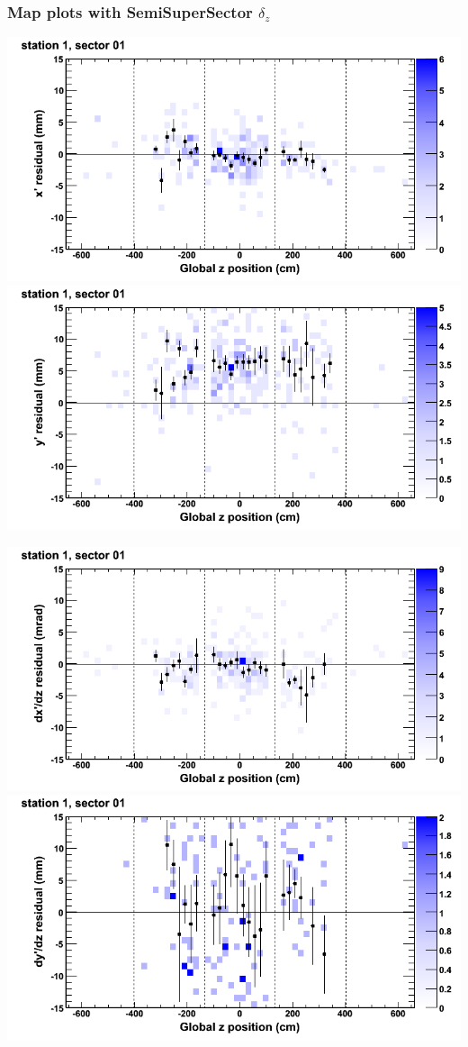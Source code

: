 \documentclass[compress]{beamer}
\begin{document}
\begin{frame}
\frametitle{Map plots with SemiSuperSector $\delta_z$}
\includegraphics[width=0.5\linewidth]{zfit_mapplots/DTvsz_st1sec01_x.png}
\includegraphics[width=0.5\linewidth]{zfit_mapplots/DTvsz_st1sec01_y.png}

\includegraphics[width=0.5\linewidth]{zfit_mapplots/DTvsz_st1sec01_dxdz.png}
\includegraphics[width=0.5\linewidth]{zfit_mapplots/DTvsz_st1sec01_dydz.png}
\end{frame}
\end{document}
